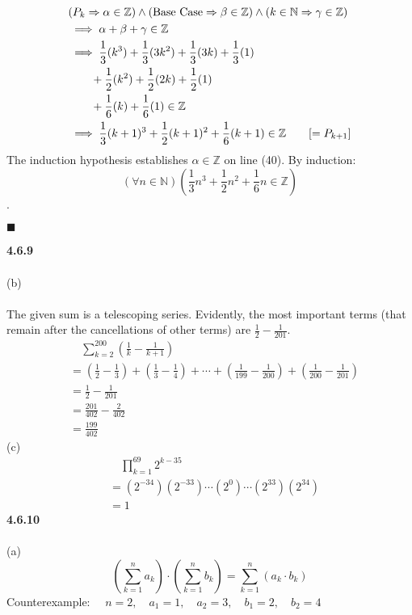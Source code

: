 \documentclass[12pt]{article}
\begin{document}
\begin{align}
& (P_k \Rightarrow \alpha \in \mathbb{Z}) \land (\textnormal{Base Case} \Rightarrow \beta \in \mathbb{Z}) \land (k \in \mathbb{N} \Rightarrow \gamma \in \mathbb{Z})\\
&\implies \alpha+\beta+\gamma \in \mathbb{Z}\\
&\implies \frac{1}{3}(k^3)+\frac{1}{3}(3k^2)+\frac{1}{3}(3k)+\frac{1}{3}(1)\\
&\quad\quad+ \frac{1}{2}(k^2)+\frac{1}{2}(2k)+\frac{1}{2}(1)\\
&\quad\quad+ \frac{1}{6}(k)+\frac{1}{6}(1) \in \mathbb{Z}\\
&\implies \frac{1}{3}(k+1)^3+\frac{1}{2}(k+1)^2+\frac{1}{6}(k+1) \in \mathbb{Z} \quad\quad [= P_{k+1}]
\end{align}
The induction hypothesis establishes $\alpha \in \mathbb{Z}$ on line (40). By induction: $$(\forall n \in \mathbb{N})\left(\frac{1}{3}n^3+\frac{1}{2}n^2+\frac{1}{6}n \in \mathbb{Z}\right)$$.
\begin{flushright}
$\blacksquare$
\end{flushright}
\textbf{4.6.9}\\\\
(b)\\\\
The given sum is a telescoping series. Evidently, the most important terms (that remain after the cancellations of other terms) are $\frac{1}{2} - \frac{1}{201}$.
\begin{align}
&\quad \sum_{k=2}^{200}\left(\frac{1}{k}-\frac{1}{k+1}\right)\\
&= \left(\frac{1}{2}-\frac{1}{3}\right)+\left(\frac{1}{3}-\frac{1}{4}\right)+\cdots+\left(\frac{1}{199}-\frac{1}{200}\right)+\left(\frac{1}{200}-\frac{1}{201}\right)\\
&= \frac{1}{2}-\frac{1}{201}\\
&= \frac{201}{402}-\frac{2}{402}\\
&= \frac{199}{402}
\end{align}
(c)
\begin{align}
&\quad \prod_{k=1}^{69}2^{k-35}\\
&= (2^{-34})(2^{-33})\cdots(2^0)\cdots(2^{33})(2^{34})\\
&= 1
\end{align}
\textbf{4.6.10}\\\\
(a)
$$\left(\sum_{k=1}^{n}a_k\right)\cdot\left(\sum_{k=1}^{n}b_k\right)=\sum_{k=1}^{n}(a_k \cdot b_k)$$
Counterexample: $\quad  n=2, \quad a_1 = 1, \quad a_2 = 3, \quad b_1=2, \quad b_2=4$
\end{document}
